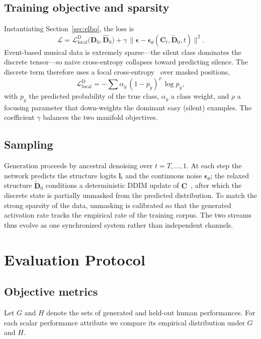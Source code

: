 \documentclass[review]{elsarticle}
\begin{document}
\subsection{Training objective and sparsity}
\label{sec:objective}
Instantiating Section~\ref{sec:elbo}, the loss is
\begin{equation}
\mathcal{L}=\mathcal{L}^{\mathrm{D}}_{\mathrm{focal}}\big(\mathbf{D}_0,\hat{\mathbf{D}}_0\big)
+\gamma\,\big\lVert\boldsymbol{\epsilon}-\boldsymbol{\epsilon}_\theta(\mathbf{C}_t,\tilde{\mathbf{D}}_0,t)\big\rVert^2 .
\end{equation}
Event-based musical data is extremely sparse---the silent class dominates the discrete
tensor---so naive cross-entropy collapses toward predicting silence. The discrete term
therefore uses a focal cross-entropy~\cite{lin2017focal} over masked positions,
\begin{equation}
\mathcal{L}^{\mathrm{D}}_{\mathrm{focal}}=-\sum \alpha_y\,(1-p_y)^{\rho}\,\log p_y,
\end{equation}
with $p_y$ the predicted probability of the true class, $\alpha_y$ a class weight, and
$\rho$ a focusing parameter that down-weights the dominant easy (silent) examples. The
coefficient $\gamma$ balances the two manifold objectives.

\subsection{Sampling}
\label{sec:sampling}
Generation proceeds by ancestral denoising over $t=T,\dots,1$. At each step the network
predicts the structure logits $\mathbf{l}_t$ and the continuous noise
$\boldsymbol{\epsilon}_\theta$; the relaxed structure $\tilde{\mathbf{D}}_0$ conditions a
deterministic DDIM update of $\mathbf{C}$~\cite{song2021ddim}, after which the discrete
state is partially unmasked from the predicted distribution. To match the strong sparsity
of the data, unmasking is calibrated so that the generated activation rate tracks the
empirical rate of the training corpus. The two streams thus evolve as one synchronized
system rather than independent channels.

\section{Evaluation Protocol}
\label{sec:eval}

\subsection{Objective metrics}
Let $G$ and $H$ denote the sets of generated and held-out human performances. For each
scalar performance attribute we compare its empirical distribution under $G$ and $H$.
\end{document}
